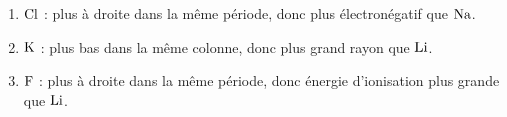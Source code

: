 \documentclass[11pt,a4paper]{article}
\begin{document}
\begin{corrige}
\begin{enumerate}[label=\alph*)]
  \item \textbf{$\ce{Cl}$} : plus à droite dans la même période, donc plus électronégatif que $\ce{Na}$.
  \item \textbf{$\ce{K}$} : plus bas dans la même colonne, donc plus grand rayon que $\ce{Li}$.
  \item \textbf{$\ce{F}$} : plus à droite dans la même période, donc énergie d'ionisation plus grande
        que $\ce{Li}$.
\end{enumerate}
\end{corrige}
\end{document}

